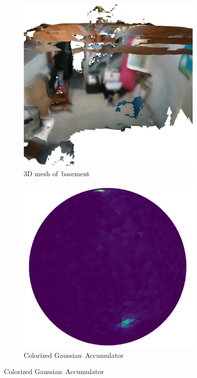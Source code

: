 \begin{figure}[H]
\centering
 \captionsetup[subfigure]{justification=centering}
  \begin{subfigure}[t]{.40\linewidth}
    \centering\includegraphics[clip,trim=0.1cm 0cm 0.99cm 0.6cm, width=.80\linewidth]{chapter_3_polylidar3d/imgs/basement_mesh_v2.pdf}
    \caption{3D mesh of~basement\label{fig:ch3_basement_mesh}}
  \end{subfigure}
  \hfill
  \begin{subfigure}[t]{.40\linewidth}
    \centering\includegraphics[clip,trim=0.1cm 0cm 0.99cm 0.40cm,width=.80\linewidth]{chapter_3_polylidar3d/imgs/basement_ga.pdf}
    \caption{Colorized Gaussian~Accumulator\label{fig:ch3_basement_ga}}

\end{subfigure}
\end{figure}
